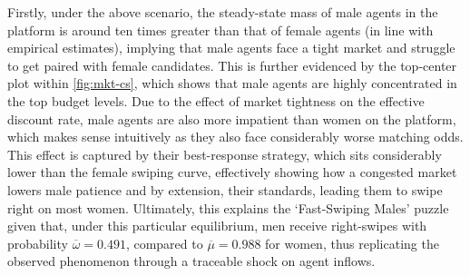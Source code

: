 Firstly, under the above scenario, the steady-state mass of male agents in the platform is around ten times greater than that of female agents (in line with empirical estimates), implying that male agents face a tight market and struggle to get paired with female candidates. This is further evidenced by the top-center plot within \autoref{fig:mkt-cs}, which shows that male agents are highly concentrated in the top budget levels. Due to the effect of market tightness on the effective discount rate, male agents are also more impatient than women on the platform, which makes sense intuitively as they also face considerably worse matching odds. This effect is captured by their best-response strategy, which sits considerably lower than the female swiping curve, effectively showing how a congested market lowers male patience and by extension, their standards, leading them to swipe right on most women. Ultimately, this explains the `Fast-Swiping Males' puzzle given that, under this particular equilibrium, men receive right-swipes with probability $\overline\omega=0.491$, compared to $\overline\mu=0.988$ for women, thus replicating the observed phenomenon through a traceable shock on agent inflows.